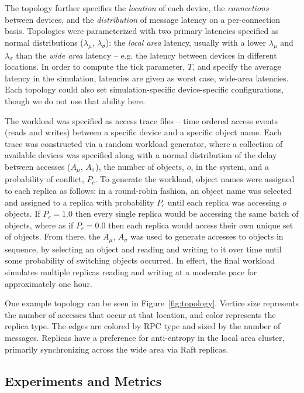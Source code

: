 \documentclass[10pt,conference,letterpaper]{IEEEtran}
\begin{document}
The topology further specifies the \textit{location} of each device, the
\textit{connections} between devices, and the \textit{distribution} of message latency on
a per-connection basis.
Topologies were parameterized with two primary latencies specified as normal distributions ($\lambda_{\mu}$,
$\lambda_{\sigma}$): the \textit{local area} latency, usually with a lower $\lambda_{\mu}$
and $\lambda_{\sigma}$ than the \textit{wide area} latency -- e.g.
the latency between devices in different locations.
In order to compute the tick parameter, $T$, and specify the average latency in the
simulation, latencies are given as worst case, wide-area latencies.
Each topology could also set simulation-specific device-specific configurations, though we
do not use that ability here.

The workload was specified as access trace files -- time ordered access events (reads and
writes) between a specific device and a specific object name.
Each trace was constructed via a random workload generator, where a collection of
available devices was specified along with a normal distribution of the delay between
accesses ($A_{\mu}$, $A_{\sigma}$), the number of objects, $o$, in the system, and a
probability of conflict, $P_c$.
To generate the workload, object names were assigned to each replica as follows: in a
round-robin fashion, an object name was selected and assigned to a replica with
probability $P_c$ until each replica was accessing $o$ objects.
If $P_c = 1.0$ then every single replica would be accessing the same batch of objects,
where as if $P_c = 0.0$ then each replica would access their own unique set of objects.
From there, the $A_{\mu}$, $A_{\sigma}$ was used to generate accesses to objects in
sequence, by selecting an object and reading and writing to it over time until some
probability of switching objects occurred.
In effect, the final workload simulates multiple replicas reading and writing at a
moderate pace for approximately one hour.

One example topology can be seen in Figure~\ref{fig:topology}.
Vertice size represents the number of
accesses that occur at that location, and color represents the
replica type.
The edges are colored by RPC type and sized by the
number of messages.
Replicas have a preference for anti-entropy in the local
area cluster, primarily synchronizing across the wide area via Raft replicas.

\subsection{Experiments and Metrics}
\end{document}
